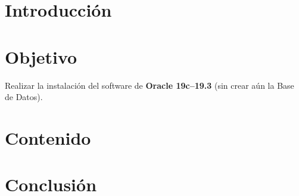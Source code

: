 \documentclass{IEEEtran}
\begin{document}
\author{Cristian Romero Andrade}
\title{\tituloPractica{}}

\author{}

\date{ }



\maketitle{}
\tableofcontents{}

\dotfill{}

\begin{abstract}

\end{abstract}

\dotfill{}

\section{Introducción}\label{sec:introduccion}

\section{Objetivo}\label{sec:objetivo}
Realizar la instalación del software de \textbf{Oracle 19c--19.3} (sin crear aún
la Base de Datos).

\section{Contenido}\label{sec:contenido}


\clearpage{}


\section{Conclusión}\label{sec:conclusion}


\newpage{}

\listoffigures{}

\printbibliography{}
\end{document}
